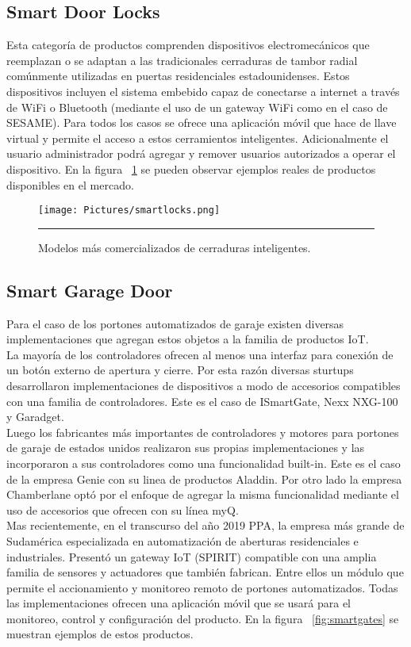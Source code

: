 \subsection{Smart Door Locks}
Esta categoría de productos comprenden dispositivos electromecánicos que reemplazan o se adaptan a las tradicionales cerraduras de tambor radial comúnmente utilizadas en puertas residenciales estadounidenses.
Estos dispositivos incluyen el sistema embebido capaz de conectarse a internet a través de WiFi o Bluetooth (mediante el uso de un gateway WiFi como en el caso de SESAME).
Para todos los casos se ofrece una aplicación móvil que hace de llave virtual y permite el acceso a estos cerramientos inteligentes.
Adicionalmente el usuario administrador podrá agregar y remover usuarios autorizados a operar el dispositivo.
En la figura ~\ref{fig:smartlocks} se pueden observar ejemplos reales de productos disponibles en el mercado.

\begin{figure}[htbp]
	\centering
	\texttt{[image: Pictures/smartlocks.png]}
	\rule{35em}{1pt}
	\caption[Smart Locks]{Modelos más comercializados de cerraduras inteligentes.}
	\label{fig:smartlocks}
\end{figure}

\subsection{Smart Garage Door}
Para el caso de los portones automatizados de garaje existen diversas implementaciones que agregan estos objetos a la familia de productos IoT.\\
La mayoría de los controladores ofrecen al menos una interfaz para conexión de un botón externo de apertura y cierre. Por esta razón diversas sturtups desarrollaron implementaciones de dispositivos a modo de accesorios compatibles con una familia de controladores. Este es el caso de ISmartGate, Nexx NXG-100 y Garadget.\\
Luego los fabricantes más importantes de controladores y motores para portones de garaje de estados unidos realizaron sus propias implementaciones y las incorporaron a sus controladores como una funcionalidad built-in. Este es el caso de la empresa Genie con su linea de productos Aladdin. Por otro lado la empresa Chamberlane optó por el enfoque de agregar la misma funcionalidad mediante el uso de accesorios que ofrecen con su línea myQ.\\
Mas recientemente, en el transcurso del año 2019 PPA, la empresa más grande de Sudamérica especializada en automatización de aberturas residenciales e industriales. Presentó un gateway IoT (SPIRIT) compatible con una amplia familia de sensores y actuadores que también fabrican. Entre ellos un módulo que permite el accionamiento y monitoreo remoto de portones automatizados.
Todas las implementaciones ofrecen una aplicación móvil que se usará para el monitoreo, control y configuración del producto.
En la figura ~\ref{fig:smartgates} se muestran ejemplos de estos productos.

